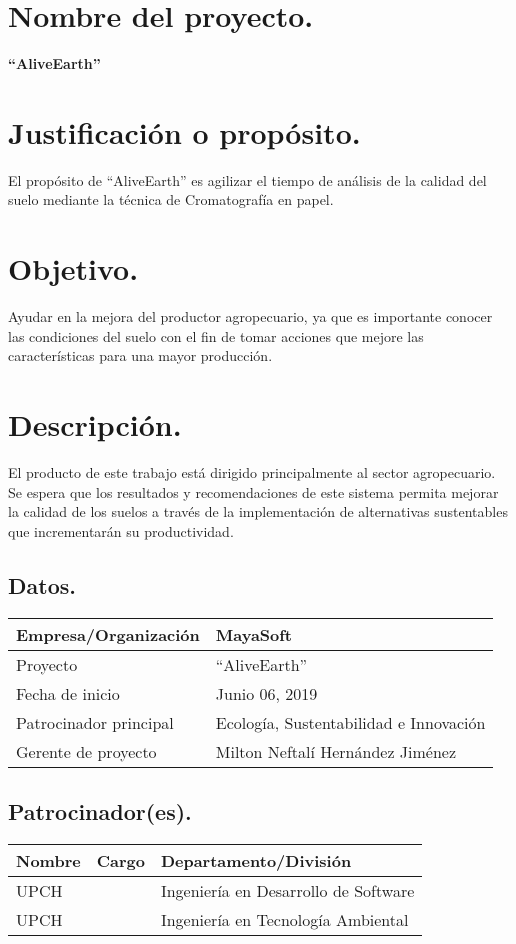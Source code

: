 \section{Nombre del proyecto.}
\textbf{“AliveEarth”}

\section{Justificación o propósito.}
El propósito de “AliveEarth” es agilizar el tiempo de análisis de 
la calidad del suelo mediante la técnica de Cromatografía en papel.

\section{Objetivo.}
Ayudar en la mejora del productor agropecuario, ya que es importante 
conocer las condiciones del suelo con el fin de tomar acciones que mejore 
las características para una mayor producción.

\section{Descripción.}
El producto de este trabajo está dirigido principalmente al sector agropecuario. 
Se espera que los resultados y recomendaciones de este sistema permita mejorar la 
calidad de los suelos a través de la implementación de alternativas sustentables que 
incrementarán su productividad.

\subsection{Datos.}
\begin{center}
    \begin{tabular}{|p{5cm}|p{7cm}|}
        \hline
        Empresa/Organización & MayaSoft\\
        \hline
        Proyecto & “AliveEarth”\\
        \hline
        Fecha de inicio & Junio 06, 2019\\
        \hline
        Patrocinador principal & Ecología, Sustentabilidad e Innovación \\
        \hline
        Gerente de proyecto & Milton Neftalí Hernández Jiménez\\
        \hline
    \end{tabular}
\end{center}
\subsection{Patrocinador(es).}
\begin{center}
    \begin{tabular}{|p{5cm}|p{3cm}|p{5cm}|}
        \hline
        \textbf{Nombre} & \textbf{Cargo} & \textbf{Departamento/División} \\
        \hline
        UPCH & & Ingeniería en Desarrollo de Software \\
        \hline
        UPCH & & Ingeniería en Tecnología Ambiental \\
        \hline
    \end{tabular}
\end{center}

